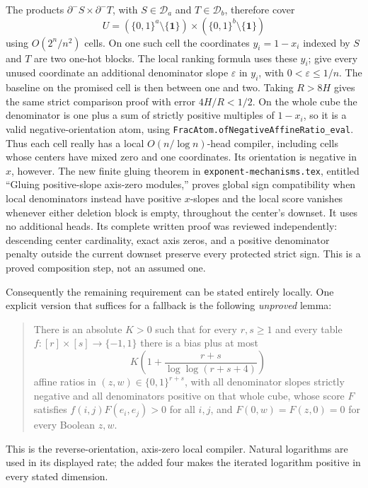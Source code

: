 \documentclass[11pt]{article}
\begin{document}
The products $\partial^-S\times\partial^-T$, with
$S\in\mathcal D_a$ and $T\in\mathcal D_b$, therefore cover
\[
 U=(\{0,1\}^a\setminus\{\mathbf1\})
       \times(\{0,1\}^b\setminus\{\mathbf1\})
\]
using $O(2^n/n^2)$ cells. On one such cell the coordinates
$y_i=1-x_i$ indexed by $S$ and $T$ are two one-hot blocks.
The local ranking formula uses these $y_i$; give every unused
coordinate an additional denominator slope $\varepsilon$ in $y_i$,
with $0<\varepsilon\leq1/n$. The baseline on the promised cell is
then between one and two. Taking $R>8H$ gives the same strict
comparison proof with error $4H/R<1/2$. On the whole cube the
denominator is one plus a sum of strictly positive multiples of
$1-x_i$, so it is a valid negative-orientation atom, using
\texttt{FracAtom.ofNegativeAffineRatio\_eval}.
Thus each cell really has a local $O(n/\log n)$-head compiler,
including cells whose centers have mixed zero and one coordinates.
Its orientation is negative in $x$, however. The new finite gluing
theorem in \texttt{exponent-mechanisms.tex}, entitled ``Gluing
positive-slope axis-zero modules,'' proves global sign compatibility
when local denominators instead have positive $x$-slopes and the
local score vanishes whenever either deletion block is empty,
throughout the center's downset. It uses no additional heads.
Its complete written proof was reviewed independently: descending
center cardinality, exact axis zeros, and a positive denominator
penalty outside the current downset preserve every protected strict
sign. This is a proved composition step, not an assumed one.

Consequently the remaining requirement can be stated entirely
locally. One explicit version that suffices for a fallback is the
following \emph{unproved} lemma:

\begin{quote}
There is an absolute $K>0$ such that for every $r,s\geq1$ and every
table $f:[r]\times[s]\to\{-1,1\}$ there is a bias plus at most
\[
 K\left(1+\frac{r+s}{\log\log(r+s+4)}\right)
\]
affine ratios in $(z,w)\in\{0,1\}^{r+s}$, with all denominator
slopes strictly negative and all denominators positive on that
whole cube, whose score $F$ satisfies
$f(i,j)F(e_i,e_j)>0$ for all $i,j$, and
$F(0,w)=F(z,0)=0$ for every Boolean $z,w$.
\end{quote}

This is the reverse-orientation, axis-zero local compiler. Natural
logarithms are used in its displayed rate; the added four makes the
iterated logarithm positive in every stated dimension.
\end{document}
